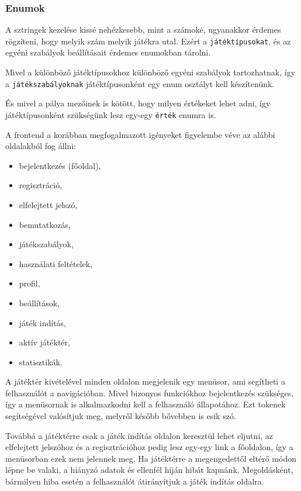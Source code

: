 

\subsubsection{Enumok}
A sztringek kezelése kissé nehézkesebb, mint a számoké, ugyanakkor érdemes rögzíteni, hogy melyik szám melyik játékra utal. Ezért a \texttt{játéktípusokat}, és az egyéni szabályok beállításait érdemes enumokban tárolni.

Mivel a különböző játéktípusokhoz különböző egyéni szabályok tartozhatnak, így a \texttt{játékszabályoknak} játéktípusonként egy enum osztályt kell készítenünk.

És mivel a pálya mezőinek is kötött, hogy milyen értékeket lehet adni, így játéktípusonként szükségünk lesz egy-egy \texttt{érték} enumra is.


A frontend a korábban megfogalmazott igényeket figyelembe véve az alábbi oldalakból fog állni:
\begin{itemize}
	\item bejelentkezés (főoldal),
	\item regisztráció,
	\item elfelejtett jelszó,
	\item bemutatkozás,
	\item játékszabályok,
	\item használati feltételek,
	\item profil,
	\item beállítások,
	\item játék indítás,
	\item aktív játéktér,
	\item statisztikák.
\end{itemize}
A játéktér kivételével minden oldalon megjelenik egy menüsor, ami segítheti a felhasználót a navigációban. Mivel bizonyos funkciókhoz bejelentkezés szükséges, így a menüsornak is alkalmazkodni kell a felhasználó állapotához. Ezt tokenek segítségével valósítjuk meg, melyről később bővebben is esik szó.

Továbbá a játéktérre csak a játék indítás oldalon keresztül lehet eljutni, az elfelejtett jelszóhoz és a regisztrációhoz pedig lesz egy-egy link a főoldalon, így a menüsorban ezek nem jelennek meg. Ha játéktérre a megengedettől eltérő módon lépne be valaki, a hiányzó adatok és ellenfél híján hibát kapnánk. Megoldásként, bármilyen hiba esetén a felhasználót átirányítjuk a játék indítás oldalra.

